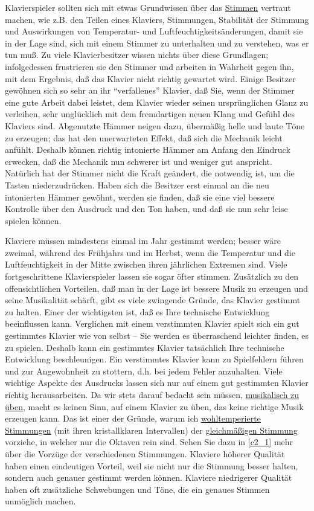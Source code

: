 Klavierspieler sollten sich mit etwas Grundwissen über das \hyperref[c2_1]{Stimmen} vertraut machen, wie z.B. den Teilen eines Klaviers, Stimmungen, Stabilität der Stimmung und Auswirkungen von Temperatur- und Luftfeuchtigkeitsänderungen, damit sie in der Lage sind, sich mit einem Stimmer zu unterhalten und zu verstehen, was er tun muß.
Zu viele Klavierbesitzer wissen nichts über diese Grundlagen; infolgedessen frustrieren sie den Stimmer und arbeiten in Wahrheit gegen ihn, mit dem Ergebnis, daß das Klavier nicht richtig gewartet wird.
Einige Besitzer gewöhnen sich so sehr an ihr \enquote{verfallenes} Klavier, daß Sie, wenn der Stimmer eine gute Arbeit dabei leistet, dem Klavier wieder seinen ursprünglichen Glanz zu verleihen, sehr unglücklich mit dem fremdartigen neuen Klang und Gefühl des Klaviers sind.
Abgenutzte Hämmer neigen dazu, übermäßig helle und laute Töne zu erzeugen; das hat den unerwarteten Effekt, daß sich die Mechanik leicht anfühlt.
Deshalb können richtig intonierte Hämmer am Anfang den Eindruck erwecken, daß die Mechanik nun schwerer ist und weniger gut anspricht.
Natürlich hat der Stimmer nicht die Kraft geändert, die notwendig ist, um die Tasten niederzudrücken.
Haben sich die Besitzer erst einmal an die neu intonierten Hämmer gewöhnt, werden sie finden, daß sie eine viel bessere Kontrolle über den Ausdruck und den Ton haben, und daß sie nun sehr leise spielen können.

Klaviere müssen mindestens einmal im Jahr gestimmt werden; besser wäre zweimal, während des Frühjahrs und im Herbst, wenn die Temperatur und die Luftfeuchtigkeit in der Mitte zwischen ihren jährlichen Extremen sind.
Viele fortgeschrittene Klavierspieler lassen sie sogar öfter stimmen.
Zusätzlich zu den offensichtlichen Vorteilen, daß man in der Lage ist bessere Musik zu erzeugen und seine Musikalität schärft, gibt es viele zwingende Gründe, das Klavier gestimmt zu halten.
Einer der wichtigsten ist, daß es Ihre technische Entwicklung beeinflussen kann.
Verglichen mit einem verstimmten Klavier spielt sich ein gut gestimmtes Klavier wie von selbst -- Sie werden es überraschend leichter finden, es zu spielen.
Deshalb kann ein gestimmtes Klavier tatsächlich Ihre technische Entwicklung beschleunigen.
Ein verstimmtes Klavier kann zu Spielfehlern führen und zur Angewohnheit zu stottern, d.h. bei jedem Fehler anzuhalten.
Viele wichtige Aspekte des Ausdrucks lassen sich nur auf einem gut gestimmten Klavier richtig herausarbeiten.
Da wir stets darauf bedacht sein müssen, \hyperref[c1iii14d]{musikalisch zu üben}, macht es keinen Sinn, auf einem Klavier zu üben, das keine richtige Musik erzeugen kann.
Das ist einer der Gründe, warum ich \hyperref[c2_2_wtk2]{wohltemperierte Stimmungen} (mit ihren kristallklaren Intervallen) der \hyperref[c2_6_et]{gleichmäßigen Stimmung} vorziehe, in welcher nur die Oktaven rein sind.
Sehen Sie dazu in \hyperref[c2_1]{\autoref{c2_1}} mehr über die Vorzüge der verschiedenen Stimmungen.
Klaviere höherer Qualität haben einen eindeutigen Vorteil, weil sie nicht nur die Stimmung besser halten, sondern auch genauer gestimmt werden können.
Klaviere niedrigerer Qualität haben oft zusätzliche Schwebungen und Töne, die ein genaues Stimmen unmöglich machen.

